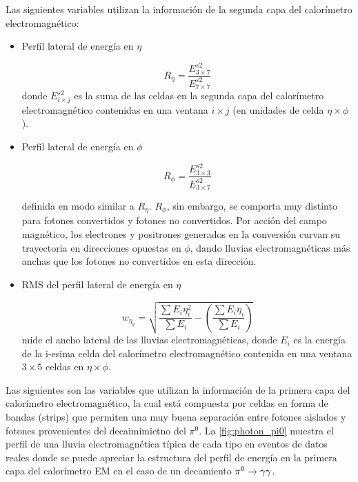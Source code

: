 Las siguientes variables utilizan la información de la segunda capa del calorímetro electromagnético:

\begin{itemize}\itemsep0.2cm\parskip0.2cm
\item Perfil lateral de energía en $\eta$

  \begin{equation}
    R_\eta = \frac{E^{s2}_{3\times 7}}{E^{s2}_{7\times 7}}
  \end{equation}
%
  donde $E^{s2}_{i\times j}$ es la suma de las celdas en la segunda capa del calorímetro
  electromagnético contenidas en una ventana $i \times j$ (en unidades de celda $\eta \times \phi$).

\item Perfil lateral de energía en $\phi$

  \begin{equation}
    R_\phi = \frac{E^{s2}_{3\times 3}}{E^{s2}_{3\times 7}}
  \end{equation}

  definida en modo similar a $R_\eta$.
  $R_\phi$, sin embargo, se comporta muy distinto para fotones convertidos y
  fotones no convertidos. Por acción del campo magnético, los electrones y positrones
  generados en la conversión curvan su trayectoria en direcciones opuestas en $\phi$,
  dando lluvias electromagnéticas más anchas que los fotones no convertidos en esta dirección.


  \item RMS del perfil lateral de energía en $\eta$

  \begin{equation}
    w_{\eta_2} = \sqrt{ \frac{\sum E_i \eta_i^2}{\sum E_i} - \left( \frac{\sum E_i \eta_i}{\sum E_i} \right) }
  \end{equation}
  mide el ancho lateral de las lluvias electromagnéticas, donde $E_i$ es la energía de la i-esima celda del
  calorímetro electromagnético contenida en una ventana $3 \times 5$ celdas en $\eta \times \phi$.
\end{itemize}

Las siguientes son las variables que utilizan la información de la primera capa
del calorímetro electromagnético, la cual está compuesta por celdas en forma de
bandas (strips) que permiten una muy buena separación entre fotones aislados y
fotones provenientes del decaimimietno del $\pi^0$. La \cref{fig:photon_pi0}
muestra el perfil de una lluvia electromagnética típica de cada tipo en eventos
de datos reales donde se puede apreciar la estructura del perfil de energía en
la primera capa del calorímetro EM en el caso de un decamiento $\pi^0 \to \gam\gam$.


